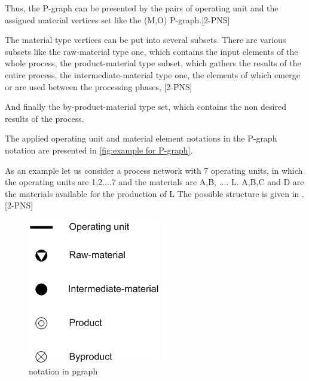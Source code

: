 Thus, the P-graph can be presented by the pairs of operating unit and the assigned material vertices set like the (M,O) P-graph.[2-PNS]

The material type vertices can be put into several subsets. 
There are various subsets like the raw-material type one, which contains 
the input elements of the whole process, the product-material type subset,
which gathers the results of the entire process, the intermediate-material type one, 
the elements of which emerge or are used between the processing phases,  [2-PNS]

And finally the by-product-material  type set, which contains the non desired results of the process. 

The applied operating unit and material element notations 
in the P-graph notation are presented in \ref{fig:example for P-graph}. 

As an example let us consider a process network with 7 operating units,
in which the operating units are 1,2....7 and the materials are A,B, .... L. A,B,C and D 
are the materials available for the production of L The possible structure is given in  . [2-PNS]

\begin{figure}[th]
	\centering
		\includegraphics{chapiter2/img/notationP}
	\caption{\label{fig:notation in pgraph}notation in pgraph}
\end{figure}



